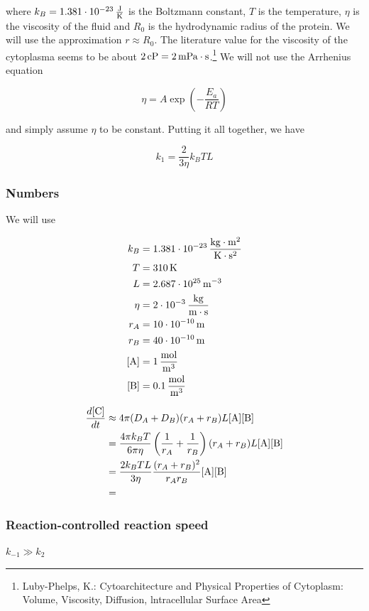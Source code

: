 \documentclass{article}
\begin{document}
	where $k_B = \unit[1.381\cdot10^{-23}]{\frac{J}{K}}$ is the Boltzmann constant, $T$ is the temperature, $\eta$ is the viscosity of the fluid and $R_0$ is the hydrodynamic radius of the protein. We will use the approximation $r \approx R_0$. The literature value for the viscosity of the cytoplasma seems to be about $\unit[2]{cP} = \unit[2]{mPa\cdot s}$.\footnote{Luby-Phelps, K.: Cytoarchitecture and Physical Properties of Cytoplasm: Volume, Viscosity, Diffusion, lntracellular Surface Area} We will not use the Arrhenius equation
	
	\begin{equation}
		\eta = A\exp{\left(-\frac{E_a}{RT}\right)}
	\end{equation}

	and simply assume $\eta$ to be constant. Putting it all together, we have
	
	\begin{equation}
		k_1 = \frac{2}{3\eta}k_BTL
	\end{equation}

	\subsubsection{Numbers}
	
	We will use 
	
	\begin{align*}
		k_B &= \unit[1.381\cdot10^{-23}]{\frac{kg\cdot m^2}{K\cdot s^2}}\\
		T &= \unit[310]{K}\\
		L &= \unit[2.687\cdot10^{25}]{m^{-3}}\\
		\eta &= \unit[2\cdot10^{-3}]{\frac{kg}{m\cdot s}}\\
		r_A &= \unit[10\cdot10^{-10}]{m}\\
		r_B &= \unit[40\cdot10^{-10}]{m}\\
		\ce{[A]} &= \unit[1]{\frac{mol}{m^3}}\\
		\ce{[B]} &= \unit[0.1]{\frac{mol}{m^3}}
	\end{align*}
	
	\begin{align}
		\frac{d\ce{[C]}}{dt} &\approx 4\pi(D_A + D_B)(r_A + r_B)L\ce{[A][B]}\\
		&= \frac{4\pi k_BT}{6\pi\eta}\left(\frac{1}{r_A}+\frac{1}{r_B}\right)(r_A+r_B)L\ce{[A][B]}\\
		&= \frac{2k_BTL}{3\eta}\frac{(r_A+r_B)^2}{r_Ar_B}\ce{[A][B]}\\
		&= 
	\end{align}
	
	\subsubsection*{Reaction-controlled reaction speed}
	$k_{-1} \gg k_2$
\end{document}
